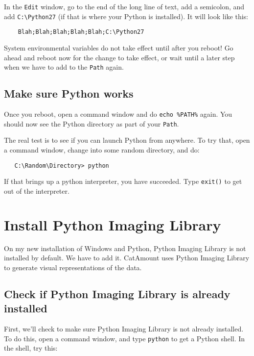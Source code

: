 In the \verb=Edit= window, go to the end of the long line of text, add a
semicolon, and add \verb=C:\Python27= (if that is where your Python is
installed). It will look like this:

\begin{verbatim}
    Blah;Blah;Blah;Blah;Blah;C:\Python27
\end{verbatim}

System environmental variables do not take effect until after you
reboot! Go ahead and reboot now for the change to take effect, or
wait until a later step when we have to add to the \verb=Path= again.

\subsection{Make sure Python works}

Once you reboot, open a command window and do \verb=echo %PATH%= again.
You should now see the Python directory as part of your \verb=Path=.

The real test is to see if you can launch Python from anywhere. To try
that, open a command window, change into some random directory, and
do:

\begin{verbatim}
   C:\Random\Directory> python
\end{verbatim}

If that brings up a python interpreter, you have succeeded.
Type \verb=exit()= to get out of the interpreter.


\section{Install Python Imaging Library}
\hypertarget{prereq-windows-pil}{}

On my new installation of Windows and Python, Python Imaging Library
is not installed by default. We have to add it. CatAmount uses Python
Imaging Library to generate visual representations of the data.

\subsection{Check if Python Imaging Library is already installed}

First, we'll check to make sure Python Imaging Library is not already
installed. To do this, open a command window, and type \verb=python=
to get a Python shell. In the shell, try this:

